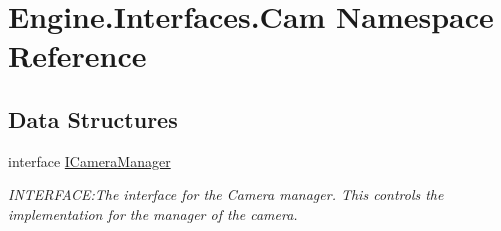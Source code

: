 \hypertarget{a00254}{}\section{Engine.\+Interfaces.\+Cam Namespace Reference}
\label{a00254}
\subsection*{Data Structures}
\begin{DoxyCompactItemize}
\item 
interface \hyperlink{a00422}{I\+Camera\+Manager}
\begin{DoxyCompactList}\small\item\em I\+N\+T\+E\+R\+F\+A\+CE\+:The interface for the Camera manager. This controls the implementation for the manager of the camera. \end{DoxyCompactList}\end{DoxyCompactItemize}
